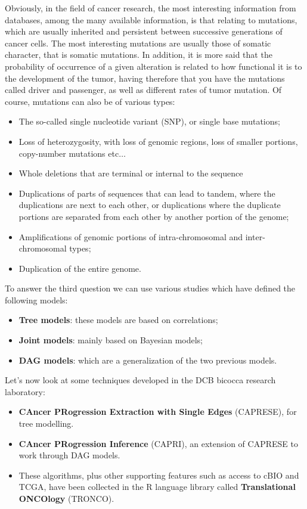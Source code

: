 Obviously, in the field of cancer research, the most interesting information from databases, among
the many available information, is that relating to mutations, which are usually inherited and
persistent between successive generations of cancer cells. The most interesting mutations are usually
those of somatic character, that is somatic mutations. In addition, it is more said that the probability
of occurrence of a given alteration is related to how functional it is to the development of the tumor,
having therefore that you have the mutations called driver and passenger, as well as different rates of
tumor mutation. Of course, mutations can also be of various types:
\begin{itemize}
    \item The so-called single nucleotide variant (SNP), or single base mutations;
    \item Loss of heterozygosity, with loss of genomic regions, loss of smaller portions,
          copy-number mutations etc$\dots$
    \item Whole deletions that are terminal or internal to the sequence
    \item Duplications of parts of sequences that can lead to tandem, where the duplications are next
          to each other, or duplications where the duplicate portions are separated from each other by
          another portion of the genome;
    \item Amplifications of genomic portions of intra-chromosomal and inter-chromosomal types;
    \item Duplication of the entire genome.
\end{itemize}

To answer the third question we can use various studies which have defined the following models:
\begin{itemize}
    \item \textbf{Tree models}: these models are based on correlations;
    \item \textbf{Joint models}: mainly based on Bayesian models;
    \item \textbf{DAG models}: which are a generalization of the two previous models.
\end{itemize}

Let’s now look at some techniques developed in the DCB bicocca research laboratory:
\begin{itemize}
    \item \textbf{CAncer PRogression Extraction with Single Edges} (CAPRESE), for tree modelling.
    \item \textbf{CAncer PRogression Inference} (CAPRI), an extension of CAPRESE to work through
          DAG models.
    \item These algorithms, plus other supporting features such as access to cBIO and TCGA, have
          been collected in the R language library called \textbf{Translational ONCOlogy} (TRONCO).
\end{itemize}

